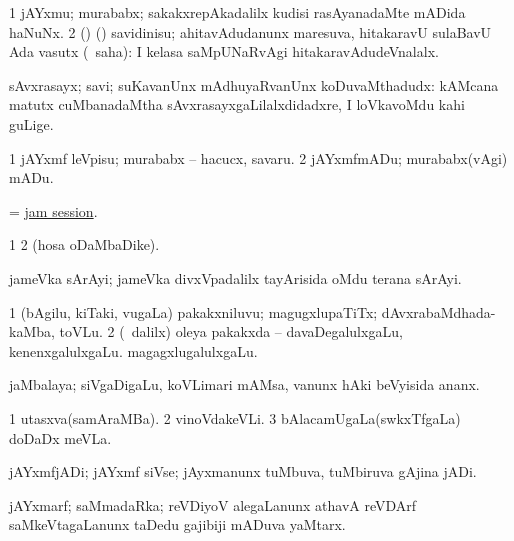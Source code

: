 \bentry
{}
\gl{\nA}
\bmng
\bnum
\num{1} jAYxmu; murababx; sakakxrepAkadalilx kudisi rasAyanadaMte mADida haNuNx. 
\num{2} (\birx) (\AmA) savidinisu; ahitavAdudanunx maresuva, hitakaravU sulaBavU Ada vasutx (\rUpa\ saha):  I kelasa saMpUNaRvAgi hitakaravAdudeVnalalx. 
\enum
\emng

\noindent
\gl{\nuga}
\bmng
{} sAvxrasayx; savi; suKavanUnx mAdhuyaRvanUnx koDuvaMthadudx:  kAMcana matutx cuMbanadaMtha sAvxrasayxgaLilalxdidadxre, I loVkavoMdu kahi guLige. 
\emng
\eentry

\bentry
{}
\gl{\sakirx}
\bmng
\bnum
\num{1} jAYxmf leVpisu; murababx -- hacucx, savaru. 
\num{2} jAYxmfmADu; murababx(vAgi) mADu. 
\enum
\emng
\eentry

\bentry
{}
\gl{\nA}
\bmng
 = \hyperlink{jam session}{jam session}. 
\emng
\eentry

\bentry
{}
\gl{\saMkiSx}
\bmng
\bnum
\num{1}  
\num{2}  (hosa oDaMbaDike). 
\enum
\emng
\eentry

\bentry
{}
\gl{\nA}
\bmng
jameVka sArAyi; jameVka divxVpadalilx tayArisida oMdu terana sArAyi. 
\emng
\eentry

\bentry
{}
\gl{\nA}
\bmng
\bnum
\num{1} (bAgilu, kiTaki, \mo vugaLa) pakakxniluvu; magugxlupaTiTx; dAvxrabaMdhada-kaMba, toVLu. 
\num{2} (\kanmu\ \bava dalilx) oleya pakakxda -- davaDegalulxgaLu, kenenxgalulxgaLu. magagxlugalulxgaLu. 
\enum
\emng
\eentry

\bentry
{}
\gl{\nA}
\bmng
jaMbalaya; siVgaDigaLu, koVLimari mAMsa, \mo vanunx hAki beVyisida ananx. 
\emng
\eentry

\bentry
{}
\gl{\nA}
\bmng
\bnum
\num{1} utasxva(samAraMBa). 
\num{2} vinoVdakeVLi. 
\num{3} bAlacamUgaLa(swkxTfgaLa) doDaDx meVLa. 
\enum
\emng
\eentry

\bentry
{}
\gl{\nA}
\bmng
jAYxmfjADi; jAYxmf siVse; jAyxmanunx tuMbuva, tuMbiruva gAjina jADi. 
\emng
\eentry

\bentry
{}
\gl{\nA}
\bmng
jAYxmarf; saMmadaRka; reVDiyoV alegaLanunx athavA reVDArf saMkeVtagaLanunx taDedu gajibiji mADuva yaMtarx. 
\emng
\eentry

